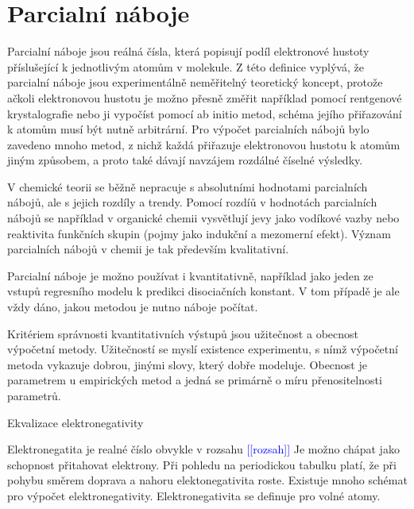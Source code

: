 \documentclass[10pt,draft,oneside]{fithesis2}
\newcommand\todo[1]{\textcolor{blue}{[[#1]]}}
\begin{document}

\chapter{Parcialní náboje}

Parcialní náboje jsou reálná čísla, která popisují podíl elektronové hustoty příslušející k jednotlivým atomům v molekule.  Z této definice vyplývá, že parcialní náboje jsou experimentálně neměřitelný teoretický koncept, protože ačkoli elektronovou hustotu je možno přesně změřit například pomocí rentgenové krystalografie nebo ji vypočíst pomocí ab initio metod, schéma jejího přiřazování k atomům musí být nutně arbitrární. Pro výpočet parcialních nábojů bylo zavedeno mnoho metod, z nichž každá přiřazuje elektronovou hustotu k atomům jiným způsobem, a proto také dávají navzájem rozdálné číselné výsledky.

V chemické teorii se běžně nepracuje s absolutními hodnotami parcialních nábojů, ale s jejich rozdíly a trendy. Pomocí rozdíů v hodnotách parcialních nábojů se například v organické chemii vysvětlují jevy jako vodíkové vazby nebo reaktivita funkčních skupin (pojmy jako indukční a mezomerní efekt). Význam parcialních nábojů v chemii je tak především kvalitativní.

Parcialní náboje je možno používat i kvantitativně, například jako jeden ze vstupů regresního modelu k predikci disociačních konstant. V tom případě je ale vždy dáno, jakou metodou je nutno náboje počítat.




Kritériem správnosti kvantitativních výstupů jsou užitečnost a obecnost výpočetní metody. Užitečností se myslí existence experimentu, s nímž výpočetní metoda vykazuje dobrou, jinými slovy, který dobře modeluje. Obecnost je parametrem u empirických metod a jedná se primárně o míru přenositelnosti parametrů.

Ekvalizace elektronegativity

Elektronegatita je realné číslo obvykle v rozsahu \todo{rozsah} Je možno chápat jako schopnost přitahovat elektrony. Při pohledu na periodickou tabulku platí, že při pohybu směrem doprava a nahoru elektonegativita roste. Existuje mnoho schémat pro výpočet elektronegativity. Elektronegativita se definuje pro volné atomy.
\end{document}
